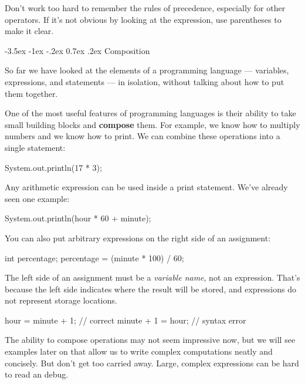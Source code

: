\documentclass[12pt]{book}
\makeatletter
\theoremstyle{exercise}
\renewcommand{\section}{\@startsection{section}{1}{\z@}%
    {-3.5ex \@plus -1ex \@minus -.2ex}%
    {0.7ex \@plus.2ex}%
    {\normalfont\Large\bfseries}}
\makeatother
\begin{document}
Don't work too hard to remember the rules of precedence, especially for other operators.
If it's not obvious by looking at the expression, use parentheses to make it clear.


\section{Composition}


So far we have looked at the elements of a programming language --- variables, expressions, and statements --- in isolation, without talking about how to put them together.

One of the most useful features of programming languages is their ability to take small building blocks and {\bf compose} them.
For example, we know how to multiply numbers and we know how to print.
We can combine these operations into a single statement:

\begin{code}
    System.out.println(17 * 3);
\end{code}

Any arithmetic expression can be used inside a print statement.
We've already seen one example:

\begin{code}
    System.out.println(hour * 60 + minute);
\end{code}

You can also put arbitrary expressions on the right side of an assignment:

\begin{code}
    int percentage;
    percentage = (minute * 100) / 60;
\end{code}

The left side of an assignment must be a {\em variable name}, not an expression.
That's because the left side indicates where the result will be stored, and expressions do not represent storage locations.

\begin{code}
    hour = minute + 1;  // correct
    minute + 1 = hour;  // syntax error
\end{code}


The ability to compose operations may not seem impressive now, but we will see examples later on that allow us to write complex computations neatly and concisely.
But don't get too carried away.
Large, complex expressions can be hard to read an debug.
\end{document}
